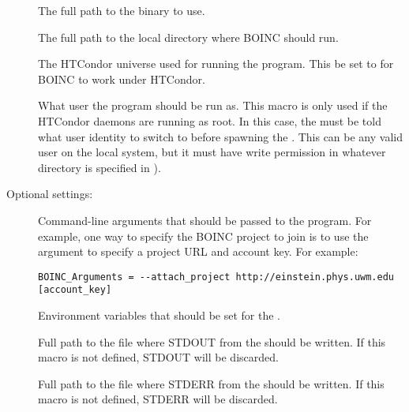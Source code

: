 \begin{description}

\item[] \label{param:BoincExecutable} The
  full path to the  binary to use.

\item[] \label{param:BoincInitialDir} The
  full path to the local directory where BOINC should run.

\item[] \label{param:BoincUniverse} The HTCondor
  universe used for running the  program.
  This  be set to  for BOINC to work under
  HTCondor.

\item[] \label{param:BoincOwner} What user the
   program should be run as.
  This macro is only used if the HTCondor daemons are running as root.
  In this case, the  must be told what user identity
  to switch to before spawning the .
  This can be any valid user on the local system, but it must have
  write permission in whatever directory is specified in
  ).

\end{description}

Optional settings:

\begin{description}

\item[] \label{param:BoincArguments}
  Command-line arguments that should be passed to the
   program.
  For example, one way to specify the BOINC project to join is to use 
  the  argument to specify a project URL and
  account key.
  For example:

\footnotesize
\begin{verbatim}
BOINC_Arguments = --attach_project http://einstein.phys.uwm.edu [account_key] 
\end{verbatim}
\normalsize

\item[] \label{param:BoincEnvironment}
  Environment variables that should be set for the
  .

\item[] \label{param:BoincOutput} Full path to
  the file where STDOUT from the  should be
  written.
  If this macro is not defined, STDOUT will be discarded.

\item[] \label{param:BoincError} Full path to
  the file where STDERR from the  should be
  written.
  If this macro is not defined, STDERR will be discarded.

\end{description}


